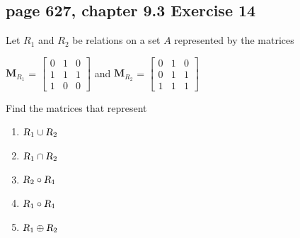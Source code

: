 \documentclass[sigconf]{acmart}
\begin{document}
\subsection{page 627, chapter 9.3 Exercise 14}
\begin{shaded}
    Let $R_1$ and $R_2$ be relations on a set $A$ represented by the matrices\\
    \begin{center}
        $\textbf{M}_{R_1}$ = 
        $
        \begin{bmatrix}
           0 & 1 & 0 \\
           1 & 1 & 1 \\
           1 & 0 & 0
        \end{bmatrix}
        $
        and
        $\textbf{M}_{R_2}$ = 
        $
        \begin{bmatrix}
           0 & 1 & 0 \\
           0 & 1 & 1 \\
           1 & 1 & 1
        \end{bmatrix}
        $
    \end{center}
    Find the matrices that represent
    \begin{enumerate}[label=(\alph*)]
        \item $\textsl{R}_1 \cup \textsl{R}_2$
        \item $\textsl{R}_1 \cap \textsl{R}_2$
        \item $\textsl{R}_2 \circ \textsl{R}_1$
        \item $\textsl{R}_1 \circ \textsl{R}_1$
        \item $\textsl{R}_1 \oplus \textsl{R}_2$
    \end{enumerate}
\end{shaded}
\end{document}
